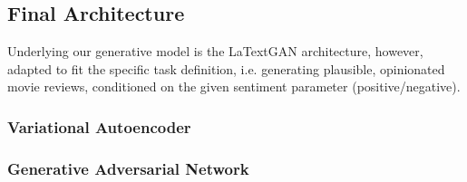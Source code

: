 \documentclass[../main]{subfiles}
\begin{document}
\subsection{Final Architecture}
Underlying our generative model is the LaTextGAN architecture, however, adapted to fit the specific task definition, i.e. generating plausible, opinionated movie reviews, conditioned on the given sentiment parameter (positive/negative).

\subsubsection{Variational Autoencoder}

\subsubsection{Generative Adversarial Network}
\end{document}
